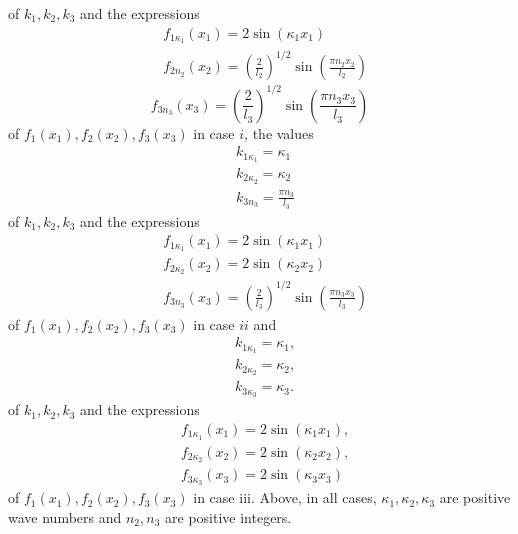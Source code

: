 \documentclass{article}
\begin{document}
of $k_{1}, k_{2}, k_{3}$ and the expressions
$$
\begin{align*}
& f_{1 \kappa_{1}}\left(x_{1}\right)=2 \sin \left(\kappa_{1} x_{1}\right)  \tag{3.15.47a}\\
& f_{2 n_{2}}\left(x_{2}\right)=\left(\frac{2}{l_{2}}\right)^{1 / 2} \sin \left(\frac{\pi n_{2} x_{2}}{l_{2}}\right) \tag{3.15.47b}
\end{align*}
$$
$$
\begin{equation*}
f_{3 n_{3}}\left(x_{3}\right)=\left(\frac{2}{l_{3}}\right)^{1 / 2} \sin \left(\frac{\pi n_{3} x_{3}}{l_{3}}\right) \tag{3.15.47c}
\end{equation*}
$$
of $f_{1}\left(x_{1}\right), f_{2}\left(x_{2}\right), f_{3}\left(x_{3}\right)$ in case $i$, the values
$$
\begin{align*}
& k_{1 \kappa_{1}}=\kappa_{1}  \tag{3.15.48a}\\
& k_{2 \kappa_{2}}=\kappa_{2}  \tag{3.15.48b}\\
& k_{3 n_{3}}=\frac{\pi n_{3}}{l_{3}} \tag{3.15.48c}
\end{align*}
$$
of $k_{1}, k_{2}, k_{3}$ and the expressions
$$
\begin{align*}
& f_{1 \kappa_{1}}\left(x_{1}\right)=2 \sin \left(\kappa_{1} x_{1}\right)  \tag{3.15.49a}\\
& f_{2 \kappa_{2}}\left(x_{2}\right)=2 \sin \left(\kappa_{2} x_{2}\right)  \tag{3.15.49b}\\
& f_{3 n_{3}}\left(x_{3}\right)=\left(\frac{2}{l_{3}}\right)^{1 / 2} \sin \left(\frac{\pi n_{3} x_{3}}{l_{3}}\right) \tag{3.15.49c}
\end{align*}
$$
of $f_{1}\left(x_{1}\right), f_{2}\left(x_{2}\right), f_{3}\left(x_{3}\right)$ in case $i i$ and
$$
\begin{align*}
& k_{1 \kappa_{1}}=\kappa_{1},  \tag{3.15.50a}\\
& k_{2 \kappa_{2}}=\kappa_{2},  \tag{3.15.50b}\\
& k_{3 \kappa_{3}}=\kappa_{3} . \tag{3.15.50c}
\end{align*}
$$
of $k_{1}, k_{2}, k_{3}$ and the expressions
$$
\begin{align*}
& f_{1 \kappa_{1}}\left(x_{1}\right)=2 \sin \left(\kappa_{1} x_{1}\right),  \tag{3.15.51a}\\
& f_{2 \kappa_{2}}\left(x_{2}\right)=2 \sin \left(\kappa_{2} x_{2}\right),  \tag{3.15.51b}\\
& f_{3 \kappa_{3}}\left(x_{3}\right)=2 \sin \left(\kappa_{3} x_{3}\right) \tag{3.15.51c}
\end{align*}
$$
of $f_{1}\left(x_{1}\right), f_{2}\left(x_{2}\right), f_{3}\left(x_{3}\right)$ in case iii. Above, in all cases, $\kappa_{1}, \kappa_{2}, \kappa_{3}$ are positive wave numbers and $n_{2}, n_{3}$ are positive integers.
\end{document}

